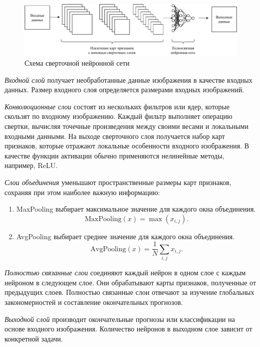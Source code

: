 \begin{figure}[h!btp]
	\centering
	\includegraphics[scale = 0.75]{inc/analysis/cnn.pdf}
	\caption{Схема сверточной нейронной сети}
	\label{fig:cnn}	
\end{figure}

\textit{Входной слой} получает необработанные данные изображения в качестве входных данных. Размер входного слоя определяется размерами входных изображений.

\textit{Конволюционные слои} состоят из нескольких фильтров или ядер, которые скользят по входному изображению. Каждый фильтр выполняет операцию свертки, вычисляя точечные произведения между своими весами и локальными входными данными. На выходе сверточного слоя получается набор карт признаков, которые отражают локальные особенности входного изображения. В качестве функции активации обычно применяются нелинейные методы, например, ReLU.

\textit{Слои объединения} уменьшают пространственные размеры карт признаков, сохраняя при этом наиболее важную информацию:
\begin{enumerate}
    \item MaxPooling выбирает максимальное значение для каждого окна объединения.
    \begin{equation}
        \text{MaxPooling}(x) = \max(x_{i,j}).
    \end{equation}
    \item AvgPooling выбирает среднее значение для каждого окна объединения.
    \begin{equation}
        \text{AvgPooling}(x) = \frac{1}{N}\sum_{i,j}x_{i,j}.
    \end{equation}
\end{enumerate}

\textit{Полностью связанные слои} соединяют каждый нейрон в одном слое с каждым нейроном в следующем слое. Они обрабатывают карты признаков, полученные от предыдущих слоев. Полностью связанные слои отвечают за изучение глобальных закономерностей и составление окончательных прогнозов.

\textit{Выходной слой} производит окончательные прогнозы или классификации на основе входного изображения. Количество нейронов в выходном слое зависит от конкретной задачи.

